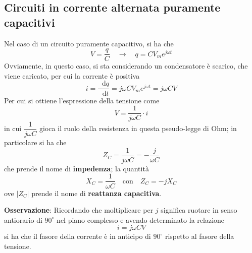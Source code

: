 \documentclass[a4paper]{extarticle}
\newcommand\dif{\mathop{}\!\mathrm{d}}
\begin{document}
\vspace{1em}
\noindent
\subsection{Circuiti in corrente alternata puramente capacitivi}
Nel caso di un circuito puramente capacitivo, si ha che
\[V=\dfrac{q}{C} \hspace{1em} \rightarrow \hspace{1em} q=C V_m e^{j \omega t}\]
Ovviamente, in questo caso, si sta considerando un condensatore è scarico, che viene caricato, per cui la corrente è positiva
\[i=\dfrac{\dif q}{\dif t} = j \omega C V_m e^{j \omega t} = j\omega C V\]
Per cui si ottiene l'espressione della tensione come
\[V=\dfrac{1}{j \omega C} \cdot i\]
in cui $\dfrac{1}{j \omega C}$ gioca il ruolo della resistenza in questa pseudo-legge di Ohm; in particolare si ha che
\[Z_C = \dfrac{1}{j \omega C} = - \dfrac{j}{\omega C}\]
che prende il nome di \textbf{impedenza}; la quantità
\[X_C = \dfrac{1}{\omega C} \hspace{1em} \text{con} \hspace{1em} Z_C = -j X_C\]
ove $\left\vert Z_C \right\vert$ prende il nome di \textbf{reattanza capacitiva}.

\vspace{2em}
\noindent
\textbf{Osservazione}: Ricordando che moltiplicare per $j$ significa ruotare in senso antiorario di $90^\circ$ nel piano complesso e avendo determinato la relazione
\[i=j\omega C V\]
si ha che il fasore della corrente è in anticipo di $90^\circ$ rispetto al fasore della tensione.
\end{document}
